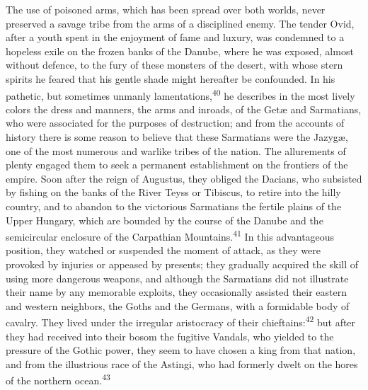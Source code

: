 


The use of poisoned arms, which has been spread over both worlds,
never preserved a savage tribe from the arms of a disciplined
enemy. The tender Ovid, after a youth spent in the enjoyment of
fame and luxury, was condemned to a hopeless exile on the frozen
banks of the Danube, where he was exposed, almost without
defence, to the fury of these monsters of the desert, with whose
stern spirits he feared that his gentle shade might hereafter be
confounded. In his pathetic, but sometimes unmanly lamentations,\textsuperscript{40}
he describes in the most lively colors the dress and manners,
the arms and inroads, of the Getæ and Sarmatians, who were
associated for the purposes of destruction; and from the accounts
of history there is some reason to believe that these Sarmatians
were the Jazygæ, one of the most numerous and warlike tribes of
the nation. The allurements of plenty engaged them to seek a
permanent establishment on the frontiers of the empire. Soon
after the reign of Augustus, they obliged the Dacians, who
subsisted by fishing on the banks of the River Teyss or Tibiscus,
to retire into the hilly country, and to abandon to the
victorious Sarmatians the fertile plains of the Upper Hungary,
which are bounded by the course of the Danube and the
semicircular enclosure of the Carpathian Mountains.\textsuperscript{41} In this
advantageous position, they watched or suspended the moment of
attack, as they were provoked by injuries or appeased by
presents; they gradually acquired the skill of using more
dangerous weapons, and although the Sarmatians did not illustrate
their name by any memorable exploits, they occasionally assisted
their eastern and western neighbors, the Goths and the Germans,
with a formidable body of cavalry. They lived under the irregular
aristocracy of their chieftains:\textsuperscript{42} but after they had received
into their bosom the fugitive Vandals, who yielded to the
pressure of the Gothic power, they seem to have chosen a king
from that nation, and from the illustrious race of the Astingi,
who had formerly dwelt on the hores of the northern ocean.\textsuperscript{43}

